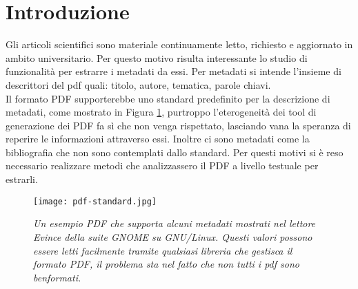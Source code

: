 \section{Introduzione}\label{intro}

Gli articoli scientifici sono materiale continuamente letto, richiesto e aggiornato in ambito universitario. Per questo motivo risulta interessante lo studio di funzionalità per estrarre i metadati da essi. Per metadati si intende l'insieme di descrittori del pdf quali: titolo, autore, tematica, parole chiavi.\\ Il formato PDF supporterebbe uno standard predefinito per la descrizione di metadati, come mostrato in Figura \ref{fig:standard}, purtroppo l'eterogeneità dei tool di generazione dei PDF fa sì che non venga rispettato, lasciando vana la speranza di reperire le informazioni attraverso essi. Inoltre ci sono metadati come la bibliografia che non sono contemplati dallo standard. Per questi motivi si è reso necessario realizzare metodi che analizzassero il PDF a livello testuale per estrarli.\\

\begin{figure}[htb]
\begin{center}
\texttt{[image: pdf-standard.jpg]}
\end{center}
\caption[Un esempio PDF che supporta alcuni metadati]{\textit{Un esempio PDF che supporta alcuni metadati mostrati nel lettore Evince della suite GNOME su GNU/Linux. Questi valori possono essere letti facilmente tramite qualsiasi libreria che gestisca il formato PDF, il problema sta nel fatto che non tutti i pdf sono benformati.}}
\label{fig:standard}
\end{figure}


